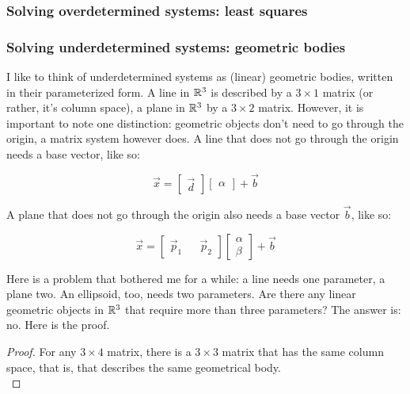 \subsubsection{Solving overdetermined systems: least squares}


\subsubsection{Solving underdetermined systems: geometric bodies}
I like to think of underdetermined systems as (linear) geometric bodies, written in their parameterized form. A line in $\mathbb{R}^3$ is described by a $3 \times 1$ matrix (or rather, it's column space), a plane in $\mathbb{R}^3$ by a $3 \times 2$ matrix. However, it is important to note one distinction: geometric objects don't need to go through the origin, a matrix system however does. A line that does not go through the origin needs a base vector, like so: 

$$\vec{x} = \begin{bmatrix} \vec{d} \end{bmatrix} \begin{bmatrix} \alpha \end{bmatrix} + \vec{b}$$ 

A plane that does not go through the origin also needs a base vector $\vec{b}$, like so: 

$$\vec{x} = \begin{bmatrix} \vec{p}_1 && \vec{p}_2 \end{bmatrix} \begin{bmatrix} \alpha  \\ \beta \end{bmatrix} + \vec{b}  $$



Here is a problem that bothered me for a while: a line needs one parameter, a plane two. An ellipsoid, too, needs two parameters. Are there any linear geometric objects in $\mathbb{R}^3$ that require more than three parameters? The answer is: no. Here is the proof. 

\begin{proof}
    For any $3 \times 4$ matrix, there is a $3 \times 3$ matrix that has the same column space, that is, that describes the same geometrical body. \\
    
\end{proof}

